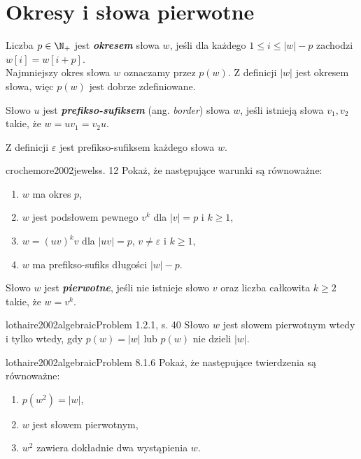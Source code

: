 \section{Okresy i słowa pierwotne}

\begin{definition}{}{}
  Liczba $p \in \N_+$ jest \textbf{\textit{okresem}} słowa $w$, jeśli dla każdego $1 \le i \le |w| - p$ zachodzi $w[i] = w[i + p]$.
  \\
  Najmniejszy okres słowa $w$ oznaczamy przez $p(w)$. Z definicji $|w|$ jest okresem słowa, więc $p(w)$ jest dobrze zdefiniowane.
\end{definition}


\begin{definition}{}{}
  Słowo $u$ jest \textbf{\textit{prefikso-sufiksem}} (ang. \emph{border}) słowa $w$, jeśli istnieją słowa $v_1, v_2$ takie, że $w = u v_1 = v_2 u$.
\end{definition}
Z definicji $\varepsilon$ jest prefikso-sufiksem każdego słowa $w$.

\begin{problem}{crochemore2002jewels}{s. 12}
  Pokaż, że następujące warunki są równoważne:
  \begin{enumerate}[label=(\roman*)]
    \item $w$ ma okres $p$,
    \item $w$ jest podsłowem pewnego $v^k$ dla $|v| = p$ i $k \ge 1$,
    \item $w = (uv)^kv$ dla $|uv| = p$, $v \neq \varepsilon$ i $k \ge 1$,
    \item $w$ ma prefikso-sufiks długości $|w| - p$.
  \end{enumerate} 
\end{problem}

\begin{definition}{}{}
  Słowo $w$ jest \textbf{\textit{pierwotne}}, jeśli nie istnieje słowo $v$ oraz liczba całkowita $k \ge 2$ takie, że $w = v^k$.
\end{definition}

\begin{problem}{lothaire2002algebraic}{Problem 1.2.1, s. 40}
  Słowo $w$ jest słowem pierwotnym wtedy i tylko wtedy, gdy $p(w) = |w|$ lub $p(w)$ nie dzieli $|w|$.
\end{problem}

\begin{problem}{lothaire2002algebraic}{Problem 8.1.6}
  Pokaż, że następujące twierdzenia są równoważne:
  \begin{enumerate}[label=(\roman*)]
    \item $p(w^2) = |w|$,
    \item $w$ jest słowem pierwotnym,
    \item $w^2$ zawiera dokładnie dwa wystąpienia $w$.
  \end{enumerate} 
\end{problem}

